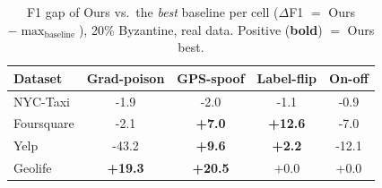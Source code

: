 \begin{table}[t]\centering\small
\caption{F1 gap of Ours vs.\ the \emph{best} baseline per cell ($\Delta$F1 $=$ Ours $-\max_{\text{baseline}}$), 20\% Byzantine, real data. Positive (\textbf{bold}) $=$ Ours best.}
\label{tab:ours_delta}
\begin{tabular}{lcccc}
\toprule
Dataset & Grad-poison & GPS-spoof & Label-flip & On-off \\
\midrule
NYC-Taxi & -1.9 & -2.0 & -1.1 & -0.9 \\
Foursquare & -2.1 & \textbf{+7.0} & \textbf{+12.6} & -7.0 \\
Yelp & -43.2 & \textbf{+9.6} & \textbf{+2.2} & -12.1 \\
Geolife & \textbf{+19.3} & \textbf{+20.5} & +0.0 & +0.0 \\
\bottomrule
\end{tabular}
\end{table}
